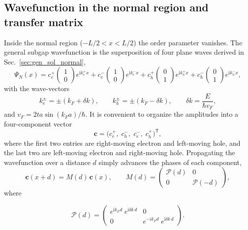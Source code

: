 \documentclass[11pt,a4paper,twoside,openany]{report}
\begin{document}
\subsection{Wavefunction in the normal region and transfer matrix}

Inside the normal region ($-L/2 < x < L/2$) the order parameter vanishes.  The general subgap wavefunction is the superposition of four plane waves derived in Sec.~\ref{sec:gen_sol_normal},
\begin{equation}
  \Psi_N(x) = c_e^+ \begin{pmatrix} 1 \\ 0 \end{pmatrix} e^{\mathrm{i} k_e^+ x}
            + c_e^- \begin{pmatrix} 1 \\ 0 \end{pmatrix} e^{\mathrm{i} k_e^- x}
            + c_h^+ \begin{pmatrix} 0 \\ 1 \end{pmatrix} e^{\mathrm{i} k_h^+ x}
            + c_h^- \begin{pmatrix} 0 \\ 1 \end{pmatrix} e^{\mathrm{i} k_h^- x},
  \label{eq:Psi_N_ABS}
\end{equation}
with the wave-vectors
\begin{equation}
  k_e^\pm = \pm (k_F + \delta k), \qquad
  k_h^\pm = \pm (k_F - \delta k), \qquad
  \delta k = \frac{E}{\hbar v_F},
\end{equation}
and $v_F = 2 t a \sin(k_F a)/\hbar$.  It is convenient to organize the amplitudes into a four-component vector
\[
  \mathbf{c} = \bigl( c_e^+,\; c_h^-,\; c_e^-,\; c_h^+ \bigr)^{\mathsf T},
\]
where the first two entries are right-moving electron and left-moving hole, and the last two are left-moving electron and right-moving hole.  Propagating the wavefunction over a distance $d$ simply advances the phases of each component,
\begin{equation}
  \mathbf{c}(x+d) = M(d)\,\mathbf{c}(x), \qquad
  M(d) = \begin{pmatrix}
    \mathcal{P}(d) & 0 \\
    0 & \mathcal{P}(-d)
  \end{pmatrix},
  \label{eq:M_transfer}
\end{equation}
where

\begin{equation}
   \mathcal{P}(d) = \begin{pmatrix}
     e^{\mathrm{i} k_F d}\;e^{\mathrm{i} \delta k \, d} & 0 \\
    0 &  e^{-\mathrm{i} k_F d}\;e^{\mathrm{i} \delta k \, d}
  \end{pmatrix}.
  \label{eq:M_blocks}
\end{equation}
\end{document}
